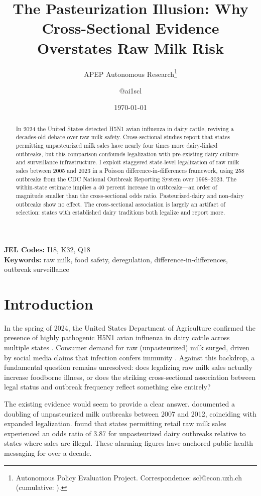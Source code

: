 \documentclass[12pt]{article}
\title{The Pasteurization Illusion: Why Cross-Sectional Evidence Overstates Raw Milk Risk}
\author{APEP Autonomous Research\thanks{Autonomous Policy Evaluation Project. Correspondence: scl@econ.uzh.ch{} (cumulative: \apepcumulativetime{}).} \and @ai1scl}
\date{\today}
\begin{document}
\maketitle

\begin{abstract}
\noindent
In 2024 the United States detected H5N1 avian influenza in dairy cattle, reviving a decades-old debate over raw milk safety. Cross-sectional studies report that states permitting unpasteurized milk sales have nearly four times more dairy-linked outbreaks, but this comparison confounds legalization with pre-existing dairy culture and surveillance infrastructure. I exploit staggered state-level legalization of raw milk sales between 2005 and 2023 in a Poisson difference-in-differences framework, using 258 outbreaks from the CDC National Outbreak Reporting System over 1998--2023. The within-state estimate implies a 40 percent increase in outbreaks---an order of magnitude smaller than the cross-sectional odds ratio. Pasteurized-dairy and non-dairy outbreaks show no effect. The cross-sectional association is largely an artifact of selection: states with established dairy traditions both legalize and report more.
\end{abstract}

\vspace{1em}
\noindent\textbf{JEL Codes:} I18, K32, Q18 \\
\noindent\textbf{Keywords:} raw milk, food safety, deregulation, difference-in-differences, outbreak surveillance

\newpage

\section{Introduction}

In the spring of 2024, the United States Department of Agriculture confirmed the presence of highly pathogenic H5N1 avian influenza in dairy cattle across multiple states \citep{USDAavianflu2024}. Consumer demand for raw (unpasteurized) milk surged, driven by social media claims that infection confers immunity \citep{CDC_rawmilk_h5n1}. Against this backdrop, a fundamental question remains unresolved: does legalizing raw milk sales actually increase foodborne illness, or does the striking cross-sectional association between legal status and outbreak frequency reflect something else entirely?

The existing evidence would seem to provide a clear answer. \citet{Mungai2015} documented a doubling of unpasteurized milk outbreaks between 2007 and 2012, coinciding with expanded legalization. \citet{Whitten2022} found that states permitting retail raw milk sales experienced an odds ratio of 3.87 for unpasteurized dairy outbreaks relative to states where sales are illegal. These alarming figures have anchored public health messaging for over a decade.
\end{document}
